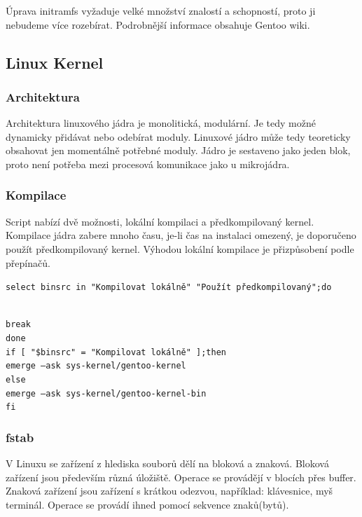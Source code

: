 \documentclass[12pt,a4paper,twoside,]{article}
\begin{document}
{{{{{{{\hspace{-1.5em}Úprava initramfs vyžaduje velké množství znalostí a schopností, proto ji nebudeme více rozebírat. Podrobnější informace obsahuje Gentoo wiki. 


\subsection{\textsf{Linux Kernel}}
\subsubsection{\textsf{Architektura}}
Architektura linuxového jádra je monolitická, modulární. Je tedy možné dynamicky přidávat nebo odebírat moduly. Linuxové jádro může tedy teoreticky obsahovat jen momentálně potřebné moduly. Jádro je sestaveno jako jeden blok, proto není potřeba mezi procesová komunikace jako u mikrojádra. 
\subsubsection{\textsf{Kompilace}}
Script nabízí dvě možnosti, lokální kompilaci a předkompilovaný kernel. Kompilace jádra zabere mnoho času, je-li čas na instalaci omezený, je doporučeno použít předkompilovaný kernel. Výhodou lokální kompilace je přizpůsobení podle přepínačů. 

\hspace{-1.5em}\texttt{select binsrc in "Kompilovat lokálně" "Použít předkompilovaný";do}}\\
\hspace*{1.5em}\texttt{break}\\
\texttt{done}\\
\texttt{if [ "\$binsrc" = "Kompilovat lokálně" ];then}\\
\texttt{\hspace*{1.5em}emerge --ask sys-kernel/gentoo-kernel}\\
\texttt{else}\\
\texttt{\hspace*{1.5em}emerge --ask sys-kernel/gentoo-kernel-bin}\\
\texttt{fi}\\
\newpage
\subsubsection{\textsf{fstab}}
V Linuxu se zařízení z hlediska souborů dělí na bloková a znaková. Bloková zařízení jsou především různá úložiště. Operace se provádějí v blocích přes buffer. Znaková zařízení jsou zařízení s krátkou odezvou, například: klávesnice, myš terminál. Operace se provádí ihned pomocí sekvence znaků(bytů).

}}}}}}
\end{document}

